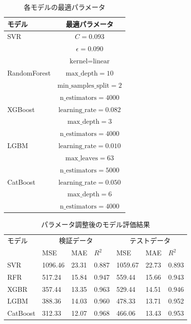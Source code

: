\begin{table}[htbp]
    \centering
    \caption{各モデルの最適パラメータ}
    \label{tab:best_params}
    \begin{tabular}{l|c}
        \hline\hline\hline
        モデル & 最適パラメータ \\
        \hline
        SVR & $C=0.093$ \\ 
            & $\epsilon=0.090$\\
            & $\text{kernel}=\text{linear}$ \\
        \hline
        RandomForest & $\text{max\_depth}=10$ \\
                     & $\text{min\_samples\_split}=2$ \\
                     & $\text{n\_estimators}=4000$ \\
        \hline
        XGBoost & $\text{learning\_rate}=0.082$ \\
                & $\text{max\_depth}=3$ \\
                & $\text{n\_estimators}=4000$ \\
        \hline
        LGBM & $\text{learning\_rate}=0.010$ \\ 
             & $\text{max\_leaves}=63$ \\
             & $\text{n\_estimators}=5000$ \\
        \hline
        CatBoost & $\text{learning\_rate}=0.050$ \\
                 & $\text{max\_depth}=6$ \\
                 & $\text{n\_estimators}=4000$ \\
        \hline\hline\hline
    \end{tabular}
\end{table}

\begin{table}[htbp]
    \centering
    \caption{パラメータ調整後のモデル評価結果}
    \label{tab:tuned_results}
    \begin{tabular}{l|p{0.8cm}p{0.8cm}p{0.8cm}|p{0.8cm}p{0.8cm}p{0.8cm}}
        \hline\hline\hline
        モデル & \multicolumn{3}{c|}{検証データ} & \multicolumn{3}{c}{テストデータ} \\
               & MSE & MAE & $R^2$ & MSE & MAE & $R^2$ \\
        \hline
        SVR       & 1096.46 & 23.31 & 0.887 & 1059.67 & 22.73 & 0.893 \\
        RFR       & 517.24  & 15.84 & 0.947 & 559.44  & 15.66 & 0.943 \\
        XGBR      & 357.44  & 13.35 & 0.963 & 529.44  & 14.51 & 0.946 \\
        LGBM      & 388.36  & 14.03 & 0.960 & 478.33  & 13.71 & 0.952 \\
        CatBoost  & 312.33  & 12.07 & 0.968 & 466.06  & 13.43 & 0.953 \\
        \hline\hline\hline
    \end{tabular}
\end{table}

